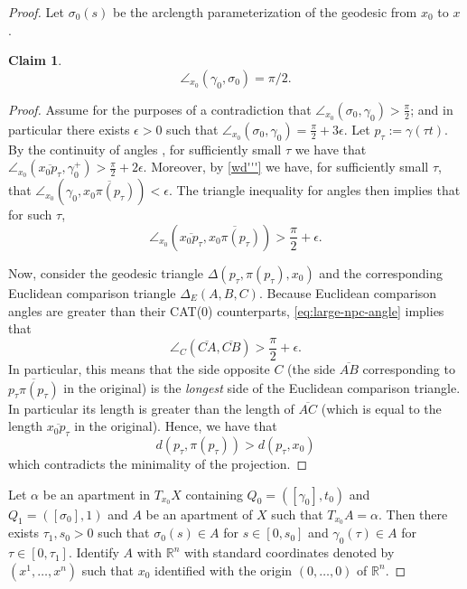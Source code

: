 \documentclass[12pt]{amsart}
\newtheorem{claim}[theorem]{Claim}
\theoremstyle{definition}
\numberwithin{equation}{section}
\begin{document}
\begin{proof}
  Let $\sigma_0(s)$ be the arclength parameterization of the geodesic from $x_0$ to $x$. 
\begin{claim}
\begin{equation} \label{ang}
\angle_{x_0}(\gamma_0, \sigma_0)=\pi/2.
\end{equation} 
\end{claim}
\begin{proof}
 Assume for the purposes of a contradiction that $\angle_{x_0}(\sigma_0,\gamma_0)>\frac\pi2$; and in particular there exists $\epsilon>0$ such that $\angle_{x_0}(\sigma_0,\gamma_0)=\frac\pi2+3\epsilon$. Let $p_\tau:= \gamma(\tau t)$.
By the continuity of angles \cite[Proposition 3.3]{bridson-haefliger}, for sufficiently small $\tau$ we have that $\angle_{x_0}(\overline{x_0p_\tau},\gamma_0^+)>\frac\pi2+2\epsilon$.  Moreover, by \eqref{wd'''} we have, for sufficiently small $\tau$, that $\angle_{x_0}(\gamma_0,\overline{x_0\pi(p_\tau)})<\epsilon$.  The triangle inequality for angles then implies that for such $\tau$,
\begin{equation}\label{eq:large-npc-angle}
\angle_{x_0}(\overline{x_0p_\tau},\overline{x_0\pi(p_\tau)})>\frac\pi2+\epsilon.
\end{equation}

Now, consider the geodesic triangle $\Delta(p_\tau,\pi(p_\tau),x_0)$ and the corresponding Euclidean comparison triangle $\Delta_E(A,B,C)$.  Because Euclidean comparison angles are greater than their CAT(0) counterparts, \eqref{eq:large-npc-angle} implies that
\begin{equation}\label{eq:large-comp-angle}
\angle_{C}(\overline{CA},\overline{CB})>\frac\pi2+\epsilon.
\end{equation}
In particular, this means that the side opposite $C$ (the side $\overline{AB}$ corresponding to $\overline{p_\tau \pi(p_\tau)}$ in the original) is the {\em longest} side of the Euclidean comparison triangle. In particular its length is greater than the length of $\overline{AC}$ (which is equal to the length $\overline{x_0p_\tau}$ in the original).  Hence, we have that
\[
d(p_\tau,\pi(p_\tau))>d(p_\tau,x_0)
\]
which contradicts the minimality of the projection.
\end{proof}



Let $\alpha$ be an apartment in $T_{x_0}X$ containing $Q_0=([\gamma_0], t_0)$ and $Q_1=([\sigma_0], 1)$ and $A$ be an apartment of $X$ such that $T_{x_0}A=\alpha$.   Then there exists  $\tau_1, s_0>0$ such that  $\sigma_0(s) \in A$ for $s \in[0,s_0]$ and $\gamma_0(\tau) \in A$ for $\tau \in [0,\tau_1]$. Identify $A$ with $\mathbb R^n$ with standard coordinates denoted by  $(x^1, \dots, x^n)$ such that  $x_0$ identified with the origin $(0,\dots, 0)$ of $\mathbb R^n$.  


\end{proof}
\end{document}

